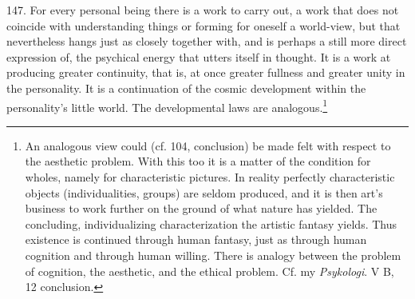 \documentclass[12pt,a4paper]{book}
\newcommand{\opage}[1]{\marginnote{\footnotesize\textit{[#1]}}}
\begin{document}
\opage{350}147. For every personal being there is a work to carry out, a work that does not coincide with
understanding things or forming for oneself a world-view, but that nevertheless hangs just as
closely together with, and is perhaps a still more direct expression of, the psychical energy that
utters itself in thought. It is a work at producing greater continuity, that is, at once greater
fullness and greater unity in the personality. It is a continuation of the cosmic development within
the personality's little world. The developmental laws are analogous.\footnote{An analogous view
could (cf. 104, conclusion) be made felt with respect to the aesthetic problem. With this too it is a
matter of the condition for wholes, namely for characteristic pictures. In reality perfectly
characteristic objects (individualities, groups) are seldom produced, and it is then art's business to
work further on the ground of what nature has yielded. The concluding, individualizing characterization
the artistic fantasy yields. Thus existence is continued through human fantasy, just as through human
cognition and through human willing. There is analogy between the problem of cognition, the aesthetic,
and the ethical problem. Cf. my \emph{Psykologi}. V B, 12 conclusion.}
\end{document}
